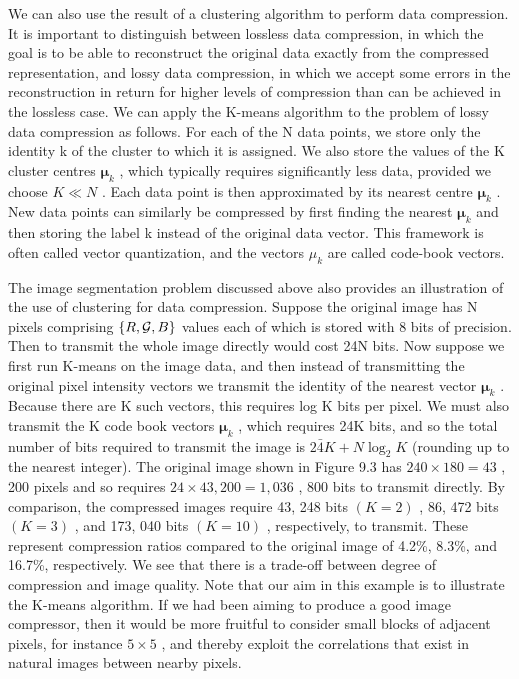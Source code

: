 \documentclass[
  10
]{article}
\begin{document}
We can also use the result of a clustering algorithm to perform data
compression. It is important to distinguish between lossless data
compression, in which the goal is to be able to reconstruct the original
data exactly from the compressed representation, and lossy data
compression, in which we accept some errors in the reconstruction in
return for higher levels of compression than can be achieved in the
lossless case. We can apply the K-means algorithm to the problem of
lossy data compression as follows. For each of the N data points, we
store only the identity k of the cluster to which it is assigned. We
also store the values of the K cluster centres \(\pmb { \mu } _ { k }\)
, which typically requires significantly less data, provided we choose
\(K \ll N\) . Each data point is then approximated by its nearest centre
\(\pmb { \mu } _ { k }\) . New data points can similarly be compressed
by first finding the nearest \(\pmb { \mu } _ { k }\) and then storing
the label k instead of the original data vector. This framework is often
called vector quantization, and the vectors \(\mu _ { k }\) are called
code-book vectors.

The image segmentation problem discussed above also provides an
illustration of the use of clustering for data compression. Suppose the
original image has N pixels comprising \(\{ R , { \cal G } , B \}\)
values each of which is stored with 8 bits of precision. Then to
transmit the whole image directly would cost 24N bits. Now suppose we
first run K-means on the image data, and then instead of transmitting
the original pixel intensity vectors we transmit the identity of the
nearest vector \(\pmb { \mu } _ { k }\) . Because there are K such
vectors, this requires log K bits per pixel. We must also transmit the K
code book vectors \(\pmb { \mu } _ { k }\) , which requires 24K bits,
and so the total number of bits required to transmit the image is
\(2 \bar { 4 } K + N \log _ { 2 } K\) (rounding up to the nearest
integer). The original image shown in Figure 9.3 has
\(2 4 0 \times 1 8 0 = 4 3\) , 200 pixels and so requires
\(2 4 \times 4 3 , 2 0 0 = 1 , 0 3 6\) , 800 bits to transmit directly.
By comparison, the compressed images require 43, 248 bits \(( K = 2 )\)
, 86, 472 bits \(( K = 3 )\) , and 173, 040 bits \(( K = 1 0 )\) ,
respectively, to transmit. These represent compression ratios compared
to the original image of 4.2\%, 8.3\%, and 16.7\%, respectively. We see
that there is a trade-off between degree of compression and image
quality. Note that our aim in this example is to illustrate the K-means
algorithm. If we had been aiming to produce a good image compressor,
then it would be more fruitful to consider small blocks of adjacent
pixels, for instance \(5 \times 5\) , and thereby exploit the
correlations that exist in natural images between nearby pixels.
\end{document}
